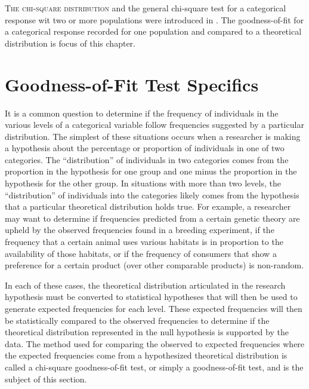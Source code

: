 \documentclass[10pt,openany]{book}\usepackage[]{graphicx}\usepackage[]{color}
\begin{document}
\lettrine{T}{he chi-square distribution} and the general chi-square test for a categorical response wit two or more populations were introduced in . The goodness-of-fit for a categorical response recorded for one population and compared to a theoretical distribution is focus of this chapter.

\section{Goodness-of-Fit Test Specifics}
It is a common question to determine if the frequency of individuals in the various levels of a categorical variable follow frequencies suggested by a particular distribution.  The simplest of these situations occurs when a researcher is making a hypothesis about the percentage or proportion of individuals in one of two categories.  The ``distribution'' of individuals in two categories comes from the proportion in the hypothesis for one group and one minus the proportion in the hypothesis for the other group.  In situations with more than two levels, the ``distribution'' of individuals into the categories likely comes from the hypothesis that a particular theoretical distribution holds true.  For example, a researcher may want to determine if frequencies predicted from a certain genetic theory are upheld by the observed frequencies found in a breeding experiment, if the frequency that a certain animal uses various habitats is in proportion to the availability of those habitats, or if the frequency of consumers that show a preference for a certain product (over other comparable products) is non-random.

In each of these cases, the theoretical distribution articulated in the research hypothesis must be converted to statistical hypotheses that will then be used to generate expected frequencies for each level.  These expected frequencies will then be statistically compared to the observed frequencies to determine if the theoretical distribution represented in the null hypothesis is supported by the data.  The method used for comparing the observed to expected frequencies where the expected frequencies come from a hypothesized theoretical distribution is called a chi-square goodness-of-fit test, or simply a goodness-of-fit test, and is the subject of this section.
\end{document}
